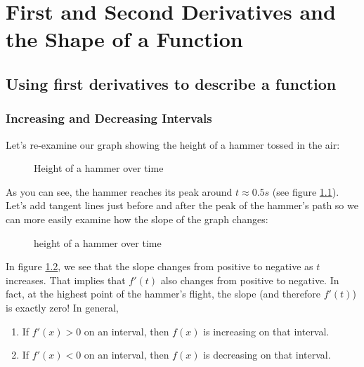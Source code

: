 \chapter{First and Second Derivatives and the Shape of a Function}
\section{Using first derivatives to describe a function}
\subsection{Increasing and Decreasing Intervals}

Let's re-examine our graph showing the height of a hammer tossed in the air:


\begin{figure}
\centering
{}
\caption{Height of a hammer over time}
\label{ref:hammerh}
\end{figure}


As you can see, the hammer reaches its peak around $t \approx 0.5s$ (see figure \ref{ref:hammerh}). Let's add tangent lines just before and after the peak of the hammer's path so we can more easily examine how the slope of the graph changes:

\begin{figure}
\centering
{}
\caption{height of a hammer over time}
\label{ref:hammerh2}
\end{figure}


In figure \ref{ref:hammerh2}, we see that the slope changes from positive to negative as $t$ increases. That implies that $f'(t)$ also changes from positive to negative. In fact, at the highest point of the hammer's flight, the slope (and therefore $f'(t)$) is exactly zero! In general, 
\begin{enumerate}
	\item If $f'(x)>0$ on an interval, then $f(x)$ is increasing on that interval.
	\item If $f'(x)<0$ on an interval, then $f(x)$ is decreasing on that interval. 
\end{enumerate}

